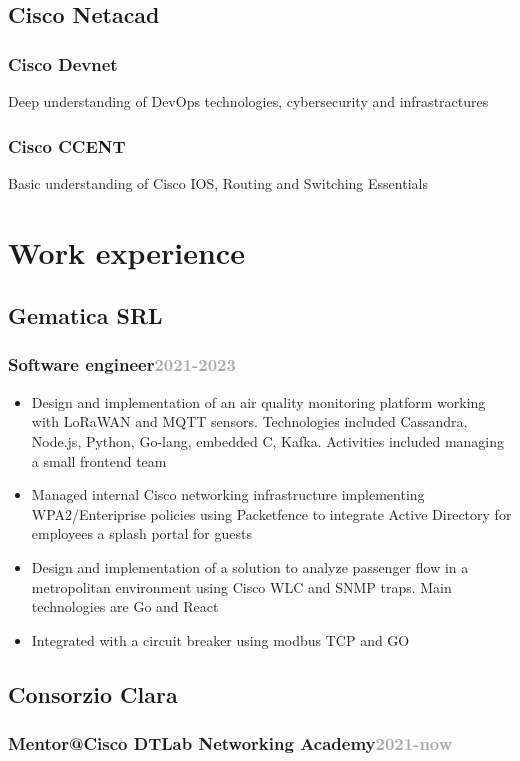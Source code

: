 \documentclass[10pt,a4paper]{article}
\begin{document}
  \subsection{Cisco Netacad}
  \subsubsection{Cisco Devnet} Deep understanding of DevOps technologies, cybersecurity and infrastractures
  \subsubsection{Cisco CCENT} Basic understanding of Cisco IOS, Routing and Switching Essentials

  \section*{Work experience}
  \subsection{Gematica SRL}
  \subsubsection{Software engineer\hfill \textcolor{darkgray}{\small{2021-2023}}}
  \begin{itemize}
    \item Design and implementation of an air quality monitoring platform working with LoRaWAN and MQTT sensors. Technologies included Cassandra, Node.js, Python, Go-lang, embedded C, Kafka. Activities included managing a small frontend team
    \item Managed internal Cisco networking infrastructure implementing WPA2/Enteriprise policies using Packetfence to integrate Active Directory for employees a splash portal for guests
    \item Design and implementation of a solution to analyze passenger flow in a metropolitan environment using Cisco WLC and SNMP traps. Main technologies are Go and React
    \item Integrated with a circuit breaker using modbus TCP and GO
  \end{itemize}

  \subsection{Consorzio Clara}
  \subsubsection{Mentor@Cisco DTLab Networking Academy\hfill \textcolor{darkgray}{\small{2021-now}}}
\end{document}
